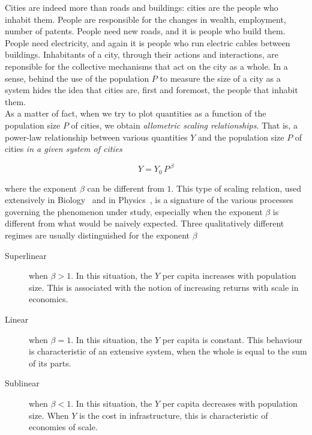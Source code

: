 Cities are indeed more than roads and buildings: cities are the people who
inhabit them. People are responsible for the changes in wealth, employment,
number of patents. People need new roads, and it is people who build them.
People need electricity, and again it is people who run electric cables between
buildings. Inhabitants of a city, through their actions and interactions, are reponsible for the collective
mechanisms that act on the city as a whole.  In a sense, behind the use of the
population $P$ to measure the size of a city as a system hides the idea 
that cities are, first and foremost, the people that inhabit them.\\

As a matter of fact, when we try to plot quantities as a function of the
population size $P$ of cities, we obtain \emph{allometric scaling
relationships}. That is, a power-law relationship between various quantities $Y$
and the population size $P$ of cities \emph{in a given system of cities} 

\begin{equation}
    Y = Y_0\,P^{\,\beta}
    \label{eq:scaling_definition}
\end{equation}

where the exponent $\beta$ can be different from $1$. This type of scaling
relation, used extensively in Biology~\cite{Thompson:1942} and in
Physics~\cite{Barenblatt:1996}, is a signature of the various processes
governing the phenomenon under study, especially when the exponent $\beta$ is
different from what would be naively expected. Three qualitatively different
regimes are usually distinguished for the exponent
$\beta$~\cite{Bettencourt:2007}

\begin{description}
    \item[Superlinear] when $\beta>1$. In this situation, the $Y$ per capita
        increases with population size. This is associated with the notion of
        increasing returns with scale in economics.
    \item[Linear] when $\beta=1$. In this situation, the $Y$ per capita is
        constant. This behaviour is characteristic of an extensive system, when
        the whole is equal to the sum of its parts.
    \item[Sublinear] when $\beta<1$. In this situation, the $Y$ per capita
        decreases with population size. When $Y$ is the cost in infrastructure,
        this is characteristic of economies of scale.
\end{description}    

